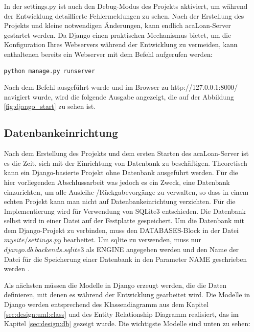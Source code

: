 In der settings.py ist auch den Debug-Modus des Projekts aktiviert, um während der Entwicklung detaillierte Fehlermeldungen zu sehen.  Nach der Erstellung des Projekts und kleine notwendigen Änderungen, kann endlich acaLoan-Server gestartet werden. Da Django einen praktischen Mechanismus bietet, um die Konfiguration Ihres Webservers während der Entwicklung zu vermeiden, kann enthaltenen bereits ein Webserver mit dem Befehl aufgerufen werden: 
\begin{lstlisting}[caption={[runserver-Befehl] },captionpos=b]
python manage.py runserver
\end{lstlisting}
Nach dem Befehl ausgeführt wurde und im Browser zu http://127.0.0.1:8000/ navigiert wurde, wird die folgende Ausgabe angezeigt, die auf der Abbildung \ref{fig:django_start} zu sehen ist.
 
\subsection{Datenbankeinrichtung}
\label{sec:server:database}
Nach dem Erstellung des Projekts und dem ersten Starten des acaLoan-Server ist es die Zeit, sich mit der Einrichtung von Datenbank zu beschäftigen. Theoretisch kann ein Django-basierte Projekt ohne Datenbank ausgeführt werden. Für die hier vorliegenden Abschlussarbeit was jedoch es ein Zweck, eine Datenbank einzurichten, um alle Ausleihe-/Rückgabevorgänge zu verwalten, so dass in einem echten Projekt kann man nicht auf Datenbankeinrichtung verzichten. Für die Implementierung wird für Verwendung von SQLite3 entschieden. Die Datenbank selbst wird in einer Datei auf der Festplatte gespeichert. Um die Datenbank mit dem Django-Projekt zu verbinden, muss den DATABASES-Block in der Datei $mysite/settings.py$ bearbeitet. Um sqlite zu verwenden, muss nur $django.db.backends.sqlite3$ als ENGINE angegeben werden und den Name der Datei für die Speicherung einer Datenbank in den Parameter NAME geschrieben werden \cite{website:15}.

Als nächsten müssen die Modelle in Django erzeugt werden, die die Daten definieren, mit denen es während der Entwicklung gearbeitet wird. Die Modelle in Django werden entsprechend des Klassendiagramm aus dem Kapitel \ref{sec:design:uml:class} und des Entity Relationship Diagramm realisiert, das im Kapitel \ref{sec:design:db} gezeigt wurde. Die wichtigste Modelle sind unten zu sehen:

